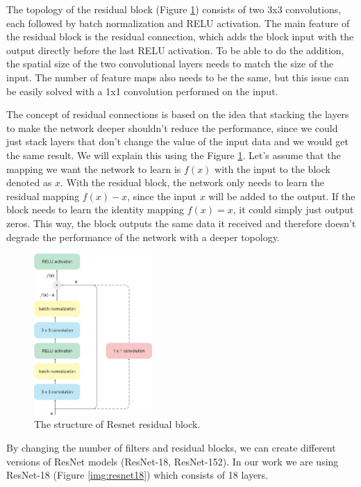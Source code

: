 The topology of the residual block (Figure \ref{img:resblock0}) consists of two 3x3 convolutions, each followed by batch normalization and RELU activation. The main feature of the residual block is the residual connection, which adds the block input with the output directly before the last RELU activation. To be able to do the addition, the spatial size of the two convolutional layers needs to match the size of the input. The number of feature maps also needs to be the same, but this issue can be easily solved with a 1x1 convolution performed on the input. 

The concept of residual connections is based on the idea that stacking the layers to make the network deeper shouldn't reduce the performance, since we could just stack layers that don't change the value of the input data and we would get the same result. 
We will explain this using the Figure \ref{img:resblock0}. Let's assume that the mapping we want the network to learn is $f(x)$ with the input to the block denoted as $x$. With the residual block, the network only needs to learn the residual mapping $f(x) - x$, since the input $x$ will be added to the output. If the block needs to learn the identity mapping $f(x) = x$, it could simply just output zeros. This way, the block outputs the same data it received and therefore doesn't degrade the performance of the network with a deeper topology. 

\begin{figure}[h]
    \centering
    \includegraphics[width=0.4\textwidth]{images/residualblock.png}
    \caption{The structure of Resnet residual block.}
    \label{img:resblock0}
\end{figure}

By changing the number of filters and residual blocks, we can create different versions of ResNet models (ResNet-18, ResNet-152). In our work we are using ResNet-18 (Figure \ref{img:resnet18}) which consists of 18 layers. 


